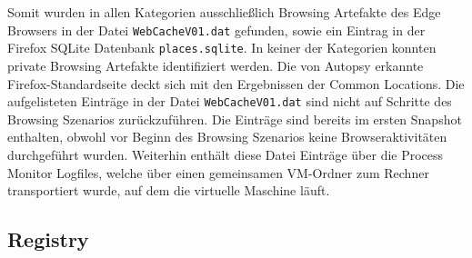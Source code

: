\begin{appendices}
Somit wurden in allen Kategorien ausschließlich Browsing Artefakte des Edge Browsers in der Datei \texttt{WebCacheV01.dat} gefunden, sowie ein Eintrag in der Firefox SQLite Datenbank \texttt{places.sqlite}. In keiner der Kategorien konnten private Browsing Artefakte identifiziert werden. Die von Autopsy erkannte Firefox-Standardseite deckt sich mit den Ergebnissen der Common Locations. Die aufgelisteten Einträge in der Datei \texttt{WebCacheV01.dat} sind nicht auf Schritte des Browsing Szenarios zurückzuführen. Die Einträge sind bereits im ersten Snapshot enthalten, obwohl vor Beginn des Browsing Szenarios keine Browseraktivitäten durchgeführt wurden. Weiterhin enthält diese Datei Einträge über die Process Monitor Logfiles, welche über einen gemeinsamen VM-Ordner zum Rechner transportiert wurde, auf dem die virtuelle Maschine läuft.


\subsection*{Registry}
\label{subsection:appendix-firefox-registry}


\end{appendices}
